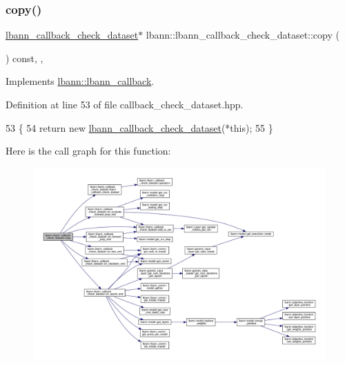 \subsubsection{\texorpdfstring{copy()}{copy()}}
{\footnotesize\ttfamily \hyperlink{classlbann_1_1lbann__callback__check__dataset}{lbann\+\_\+callback\+\_\+check\+\_\+dataset}$\ast$ lbann\+::lbann\+\_\+callback\+\_\+check\+\_\+dataset\+::copy (\begin{DoxyParamCaption}{ }\end{DoxyParamCaption}) const\hspace{0.3cm}{\ttfamily [inline]}, {\ttfamily [override]}, {\ttfamily [virtual]}}



Implements \hyperlink{classlbann_1_1lbann__callback_a9f545d1269a8c7af335625d049691f26}{lbann\+::lbann\+\_\+callback}.



Definition at line 53 of file callback\+\_\+check\+\_\+dataset.\+hpp.


\begin{DoxyCode}
53                                                       \{
54     \textcolor{keywordflow}{return} \textcolor{keyword}{new} \hyperlink{classlbann_1_1lbann__callback__check__dataset_a79beae9767b50f7141bc5209ef5d696f}{lbann\_callback\_check\_dataset}(*\textcolor{keyword}{this});
55   \}
\end{DoxyCode}
Here is the call graph for this function\+:\nopagebreak
\begin{figure}[H]
\begin{center}
\leavevmode
\includegraphics[width=350pt]{classlbann_1_1lbann__callback__check__dataset_a8be592f1687aea003986c874dc5f7516_cgraph}
\end{center}
\end{figure}
\mbox{\label{classlbann_1_1lbann__callback__check__dataset_a150273f878be4d4bf0cdcaf0ba52aef2}} 
